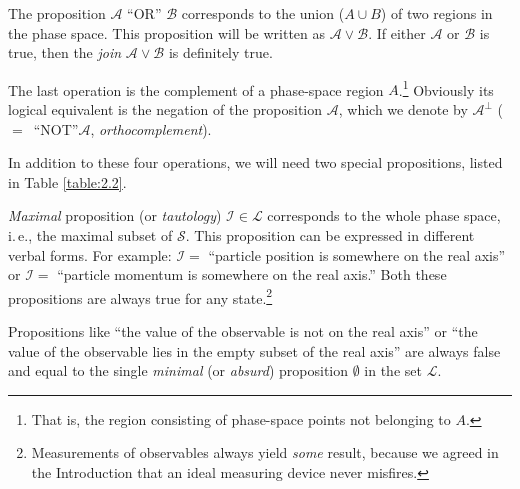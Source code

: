 \documentclass[nochecklpage]{stefan1}
\theoremstyle{definition}
\begin{document}
The proposition $ \mathcal{A} $ ``OR'' $ \mathcal{B} $ corresponds to
the union ($ A \cup B $) of two regions in the phase space. This
proposition will be written as $ \mathcal{A} \vee \mathcal{B} $. If
either $ \mathcal{A} $ or $ \mathcal{B} $ is true, then the
\emph{join} $ \mathcal{A} \vee \mathcal{B} $ is definitely true.

The last operation is the complement of a phase-space region $ A
$.\footnote{That is, the region consisting of phase-space points not
belonging to $A$.} Obviously its logical equivalent is the negation of
the proposition $ \mathcal{A} $, which we denote by $ \mathcal{A}^{
\perp } $ ($=$~``NOT''$ \mathcal{A} $, \emph{orthocomplement}).\label{lb:orthocomplement}

In addition to these four operations, we will need two special
propositions, listed in Table \ref{table:2.2}.

\emph{Maximal} proposition (or
\emph{tautology}) $ \mathcal{I} \in \mathcal{L} $ corresponds to the whole
phase space, i.\,e., the maximal subset of $ \mathcal{S} $. This
proposition can be expressed in different verbal forms. For example:
$ \mathcal{I} = $ ``particle position is somewhere on the real axis''
or $ \mathcal{I} = $ ``particle momentum is somewhere on the real
axis.'' Both these propositions are always true for any
state.\footnote{Measurements of observables always yield \emph{some}
result, because we agreed in the Introduction that an ideal measuring
device never misfires.}\label{lb:tautology}

Propositions like ``the value of the observable is not on the real
axis'' or ``the value of the observable lies in the empty subset of the
real axis'' are always false and equal to the single \emph{minimal} (or
\emph{absurd}) proposition
$ \emptyset $ in the set $ \mathcal{L} $.\label{lb:absurd}
\end{document}
